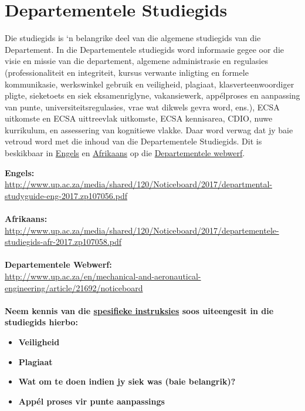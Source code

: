 \section{Departementele Studiegids}\label{sec:department}
    Die studiegids is `n belangrike deel van die algemene studiegids van die
    Departement. In die Departementele studiegids word informasie gegee oor die
    visie en missie van die departement, algemene administrasie en regulasies
    (professionaliteit en integriteit, kursus verwante inligting en formele
    kommunikasie, werkswinkel gebruik en veiligheid, plagiaat,
    klasverteenwoordiger pligte, sieketoets en siek eksamenriglyne,
    vakansiewerk, app\'{e}lproses en aanpassing van punte,
    universiteitsregulasies, vrae wat dikwels gevra word, ens.), ECSA uitkomste
    en ECSA uittreevlak uitkomste, ECSA kennisarea, CDIO, nuwe kurrikulum, en
    assessering van kognitiewe vlakke.  Daar word verwag dat jy baie vetroud
    word met die inhoud van die Departementele Studiegids. Dit is beskikbaar in
    \href{http://www.up.ac.za/media/shared/120/Noticeboard/2017/departmental-studyguide-eng-2017.zp107056.pdf}{Engels}
    en
    \href{http://www.up.ac.za/media/shared/120/Noticeboard/2017/departementele-studiegids-afr-2017.zp107058.pdf}{Afrikaans}
    op die
    \href{http://www.up.ac.za/en/mechanical-and-aeronautical-engineering/article/21692/noticeboard}{Departementele webwerf}.

    \noindent
    \textbf{Engels:} \\
    \url{http://www.up.ac.za/media/shared/120/Noticeboard/2017/departmental-studyguide-eng-2017.zp107056.pdf} \\~\\
    \textbf{Afrikaans:} \\
    \url{http://www.up.ac.za/media/shared/120/Noticeboard/2017/departementele-studiegids-afr-2017.zp107058.pdf} \\~\\
    \textbf{Departementele Webwerf:} \\
    \url{http://www.up.ac.za/en/mechanical-and-aeronautical-engineering/article/21692/noticeboard} \\~\\

    \noindent
    \textbf{Neem kennis van die \uline{spesifieke instruksies} soos uiteengesit
    in die studiegids hierbo:}
    \begin{itemize}
        \item \textbf{Veiligheid}
        \item \textbf{Plagiaat}
        \item \textbf{Wat om te doen indien jy siek was (baie belangrik)?}
        \item \textbf{App\'el proses vir punte aanpassings}
    \end{itemize}

